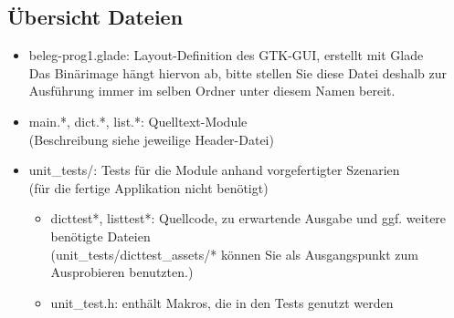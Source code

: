 \subsection{Übersicht Dateien}
\begin{itemize}
	\item beleg-prog1.glade: Layout-Definition des GTK-GUI, erstellt mit Glade \\
	Das Binärimage hängt hiervon ab, bitte stellen Sie diese Datei deshalb zur Ausführung immer im selben Ordner unter diesem Namen bereit.
	
	\item main.*, dict.*, list.*: Quelltext-Module \\
	(Beschreibung siehe jeweilige Header-Datei)
	
	\item unit\_tests/: Tests für die Module anhand vorgefertigter Szenarien \\
	(für die fertige Applikation nicht benötigt)
	\begin{itemize}		
		\item dicttest*, listtest*: Quellcode, zu erwartende Ausgabe und ggf. weitere benötigte Dateien \\
		(unit\_tests/dicttest\_assets/* können Sie als Ausgangspunkt zum Ausprobieren benutzten.)
		
		\item unit\_test.h: enthält Makros, die in den Tests genutzt werden
	\end{itemize}
\end{itemize}

